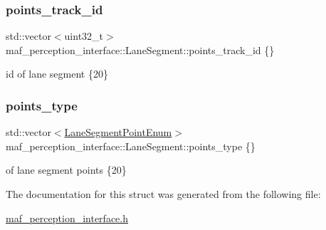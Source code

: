 \subsubsection{\texorpdfstring{points\+\_\+track\+\_\+id}{points\_track\_id}}
{\footnotesize\ttfamily std\+::vector$<$uint32\+\_\+t$>$ maf\+\_\+perception\+\_\+interface\+::\+Lane\+Segment\+::points\+\_\+track\+\_\+id \{\}}

id of lane segment \{20\} \mbox{\label{structmaf__perception__interface_1_1LaneSegment_a6606c5cbcda9805836046446bc2c3278}} 
\subsubsection{\texorpdfstring{points\+\_\+type}{points\_type}}
{\footnotesize\ttfamily std\+::vector$<$\hyperlink{structmaf__perception__interface_1_1LaneSegmentPointEnum}{Lane\+Segment\+Point\+Enum}$>$ maf\+\_\+perception\+\_\+interface\+::\+Lane\+Segment\+::points\+\_\+type \{\}}

of lane segment points \{20\} 

The documentation for this struct was generated from the following file\+:\begin{DoxyCompactItemize}
\item 
\hyperlink{maf__perception__interface_8h}{maf\+\_\+perception\+\_\+interface.\+h}\end{DoxyCompactItemize}

